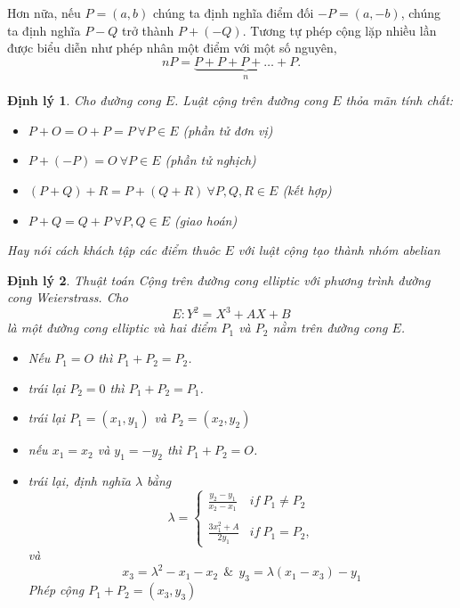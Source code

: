 \documentclass[a4paper,12pt]{report}
\newtheorem{theorem}{Định lý}[chapter]
\begin{document}
Hơn nữa, nếu $P = (a, b)$ chúng ta định nghĩa điểm đối $-P = (a, -b)$, chúng ta định nghĩa $P - Q$ trở thành $P + (-Q)$. Tương tự phép cộng lặp nhiều lần được biểu diễn như phép nhân một điểm với một số nguyên,
\begin{displaymath}
nP = \underbrace{P + P + P + \ldots + P}_{n}.
\end{displaymath}
\begin{theorem} \label{dl2.1}
Cho đường cong $E$. Luật cộng trên đường cong $E$ thỏa mãn tính chất:
\begin{itemize}
\item[(a)] $P + O = O + P = P \ \forall P \in E$ (phần tử đơn vị)
\item[(b)] $P + (-P) = O \ \forall P \in E$ (phần tử nghịch)
\item[(c)] $(P + Q) + R = P + (Q + R) \ \forall P, Q, R \in E$ (kết hợp)
\item[(d)] $P + Q = Q + P \ \forall P, Q \in E$ (giao hoán) 
\end{itemize}
Hay nói cách khách tập các điểm thuôc $E$ với luật cộng tạo thành nhóm abelian
\end{theorem}
\begin{theorem} \label{dl2.2}
Thuật toán Cộng trên đường cong elliptic với phương trình đường cong Weierstrass. Cho
\begin{displaymath}
E: Y^2 = X^3 + AX + B
\end{displaymath}
là một đường cong elliptic và hai điểm $P_1$ và $P_2$ nằm trên đường cong $E$.
\begin{itemize}
\item[(a)] Nếu $P_1 = O$ thì $P_1 + P_2 = P_2$.
\item[(b)] trái lại $P_2 = 0$ thì $P_1 + P_2 = P_1$.
\item[(c)] trái lại $P_1 = (x_1, y_1)$ và $P_2 = (x_2, y_2)$
\item[(d)] nếu $x_1 = x_2$ và $y_1 = -y_2$ thì $P_1 + P_2 = O$.
\item[(e)] trái lại, định nghĩa $\lambda$ bằng
\begin{displaymath}
\lambda = \left\{ \begin{array}{ll}
\displaystyle \frac{y_2 - y_1}{x_2 - x_1} & if \ P_1 \neq P_2  \\
\\
\displaystyle \frac{3x_1^2 + A}{2y_1} & if \ P_1 = P_2,
\end{array} \right.
\end{displaymath}
và
\begin{displaymath}
x_3 = \lambda^2 - x_1 - x_2 \ \ \& \ \ y_3 = \lambda(x_1 - x_3) - y_1
\end{displaymath}
Phép cộng $P_1 + P_2 = (x_3,y_3)$
\end{itemize}
\end{theorem}
\end{document}
